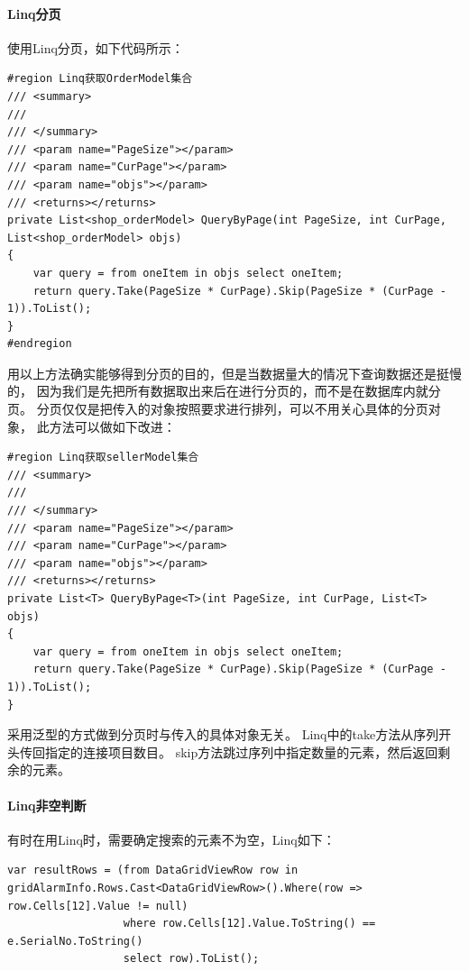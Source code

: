 \documentclass{book}
\begin{document}
\paragraph{Linq分页}

使用Linq分页，如下代码所示：

\begin{lstlisting}[language={[Sharp]C}]
#region Linq获取OrderModel集合
/// <summary>
/// 
/// </summary>
/// <param name="PageSize"></param>
/// <param name="CurPage"></param>
/// <param name="objs"></param>
/// <returns></returns>
private List<shop_orderModel> QueryByPage(int PageSize, int CurPage, List<shop_orderModel> objs)
{
    var query = from oneItem in objs select oneItem;
    return query.Take(PageSize * CurPage).Skip(PageSize * (CurPage - 1)).ToList();
}
#endregion
\end{lstlisting}

用以上方法确实能够得到分页的目的，但是当数据量大的情况下查询数据还是挺慢的，
因为我们是先把所有数据取出来后在进行分页的，而不是在数据库内就分页。
分页仅仅是把传入的对象按照要求进行排列，可以不用关心具体的分页对象，
此方法可以做如下改进：

\begin{lstlisting}[language={[Sharp]C}]
#region Linq获取sellerModel集合
/// <summary>
/// 
/// </summary>
/// <param name="PageSize"></param>
/// <param name="CurPage"></param>
/// <param name="objs"></param>
/// <returns></returns>
private List<T> QueryByPage<T>(int PageSize, int CurPage, List<T> objs)
{
    var query = from oneItem in objs select oneItem;
    return query.Take(PageSize * CurPage).Skip(PageSize * (CurPage - 1)).ToList();
}
\end{lstlisting}

采用泛型的方式做到分页时与传入的具体对象无关。
Linq中的take方法从序列开头传回指定的连接项目数目。
skip方法跳过序列中指定数量的元素，然后返回剩余的元素。

\paragraph{Linq非空判断}

有时在用Linq时，需要确定搜索的元素不为空，Linq如下：

\begin{lstlisting}[language={[Sharp]C}]
var resultRows = (from DataGridViewRow row in gridAlarmInfo.Rows.Cast<DataGridViewRow>().Where(row => row.Cells[12].Value != null)
				  where row.Cells[12].Value.ToString() == e.SerialNo.ToString()
				  select row).ToList();
\end{lstlisting}
\end{document}

